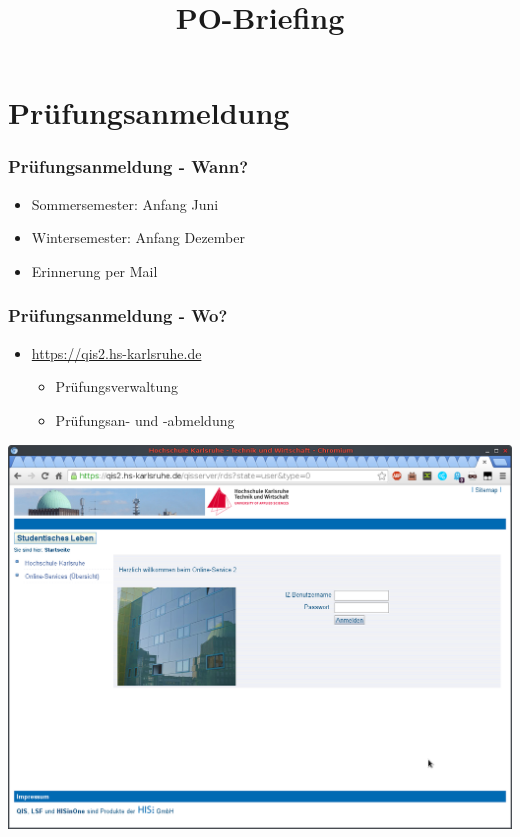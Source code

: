 \documentclass[final]{beamer}
\title{PO-Briefing}
\begin{document}
\begin{frame}
	\titlepage
\end{frame}

\section{Prüfungsanmeldung}
\begin{frame}
\frametitle{Prüfungsanmeldung - Wann?}
\begin{itemize}

\item Sommersemester: 			Anfang Juni
\item Wintersemester: 				Anfang Dezember

\item Erinnerung per Mail
\end{itemize}

\end{frame}

\begin{frame}
\frametitle{Prüfungsanmeldung - Wo?}
\begin{itemize}
\item \url{https://qis2.hs-karlsruhe.de}
	\begin{itemize}
		\item Prüfungsverwaltung
		\item Prüfungsan- und -abmeldung
	\end{itemize}
\end{itemize}
	\includegraphics[scale=0.3]{qis.png}
\end{frame}
\end{document}
